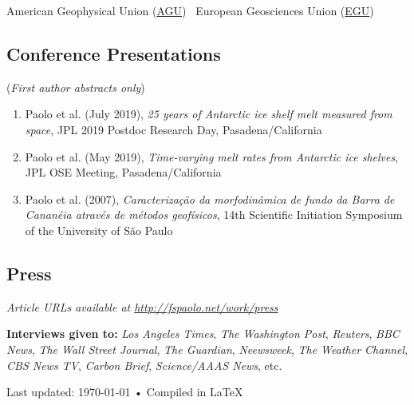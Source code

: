 \documentclass[12pt,]{scrartcl}
\begin{document}
American Geophysical Union (\href{http://sites.agu.org/}{AGU}) \, European Geosciences Union (\href{http://www.egu.eu/}{EGU}) \\


\subsection{Conference Presentations}

(\emph{First author abstracts only})

\begin{enumerate}
\leftskip-0.13in %

\item Paolo et al. (July 2019), \textit{25 years of Antarctic ice shelf melt measured from space}, JPL 2019 Postdoc Research Day, Pasadena/California %

\item Paolo et al. (May 2019), \textit{Time-varying melt rates from Antarctic ice shelves}, JPL OSE Meeting, Pasadena/California %

\item Paolo et al. (2007), \textit{Caracteriza\c{c}\~ao da morfodin\^amica de fundo da Barra de Canan\'eia atrav\'es de m\'etodos geof\'isicos}, 14th Scientific Initiation Symposium of the University of S\~ao Paulo %


\end{enumerate}


\subsection{Press}

\emph{Article URLs available at \url{http://fspaolo.net/work/press}}

\textbf{Interviews given to:} \textit{Los Angeles Times}, \textit{The Washington Post}, \textit{Reuters}, \textit{BBC News}, \textit{The Wall Street Journal}, \textit{The Guardian}, \textit{Neewsweek}, \textit{The Weather Channel}, \textit{CBS News TV}, \textit{Carbon Brief}, \textit{Science/AAAS News}, etc.


\vfill{} %

\begin{center}
{\scriptsize Last updated: \today\- •\- Compiled in \LaTeX}
\end{center}
\end{document}

